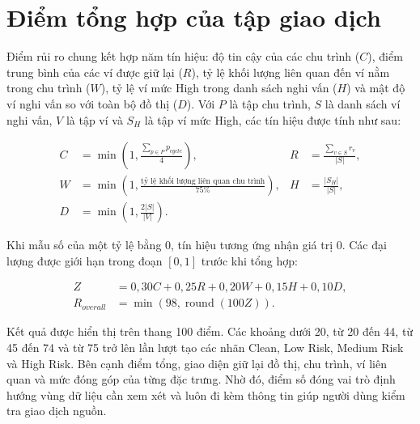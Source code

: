 \section{Điểm tổng hợp của tập giao dịch}

Điểm rủi ro chung kết hợp năm tín hiệu: độ tin cậy của các chu trình ($C$), điểm trung bình của các ví được giữ lại ($R$), tỷ lệ khối lượng liên quan đến ví nằm trong chu trình ($W$), tỷ lệ ví mức High trong danh sách nghi vấn ($H$) và mật độ ví nghi vấn so với toàn bộ đồ thị ($D$). Với $P$ là tập chu trình, $S$ là danh sách ví nghi vấn, $V$ là tập ví và $S_H$ là tập ví mức High, các tín hiệu được tính như sau:

\begin{align}
C &= \min\left(1,\frac{\sum_{p\in P}p_{cycle}}{4}\right),
& R &= \frac{\sum_{v\in S}r_v}{|S|}, \\
W &= \min\left(1,\frac{\text{tỷ lệ khối lượng liên quan chu trình}}{75\%}\right),
& H &= \frac{|S_H|}{|S|}, \\
D &= \min\left(1,\frac{2|S|}{|V|}\right). &&
\end{align}

Khi mẫu số của một tỷ lệ bằng 0, tín hiệu tương ứng nhận giá trị 0. Các đại lượng được giới hạn trong đoạn $[0,1]$ trước khi tổng hợp:

\begin{align}
Z &= 0{,}30C+0{,}25R+0{,}20W+0{,}15H+0{,}10D, \\
R_{overall} &= \min\left(98,\operatorname{round}(100Z)\right).
\end{align}

Kết quả được hiển thị trên thang 100 điểm. Các khoảng dưới 20, từ 20 đến 44, từ 45 đến 74 và từ 75 trở lên lần lượt tạo các nhãn Clean, Low Risk, Medium Risk và High Risk. Bên cạnh điểm tổng, giao diện giữ lại đồ thị, chu trình, ví liên quan và mức đóng góp của từng đặc trưng. Nhờ đó, điểm số đóng vai trò định hướng vùng dữ liệu cần xem xét và luôn đi kèm thông tin giúp người dùng kiểm tra giao dịch nguồn.
